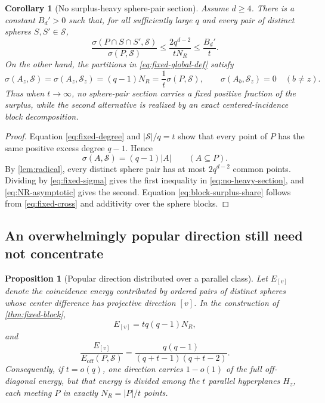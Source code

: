 \documentclass[11pt,letterpaper]{amsart}
\newtheorem{proposition}[proposition]{Proposition}
\newtheorem{corollary}[corollary]{Corollary}
\theoremstyle{definition}
\theoremstyle{remark}
\newcommand{\1}{\mathbf 1}
\begin{document}
\begin{corollary}[No surplus-heavy sphere-pair section]\label{cor:no-heavy-section}
Assume $d\ge4$.  There is a constant $B_d'>0$ such that, for all sufficiently large $q$ and every pair of distinct spheres $S,S'\in\mathcal S$,
\begin{equation}\label{eq:no-heavy-section}
 \frac{\sigma(P\cap S\cap S',\mathcal S)}
 {\sigma(P,\mathcal S)}
 \le\frac{2q^{d-2}}{tN_R}
 \le\frac{B_d'}{t}.
\end{equation}
On the other hand, the partitions in \eqref{eq:fixed-global-def} satisfy
\begin{equation}\label{eq:block-surplus-share}
 \sigma(A_z,\mathcal S)=\sigma(A_z,\mathcal S_z)=(q-1)N_R
 =\frac1t\sigma(P,\mathcal S),
 \qquad
 \sigma(A_b,\mathcal S_z)=0\quad(b\ne z).
\end{equation}
Thus when $t\to\infty$, no sphere-pair section carries a fixed positive fraction of the surplus, while the second alternative is realized by an exact centered-incidence block decomposition.
\end{corollary}

\begin{proof}
Equation \eqref{eq:fixed-degree} and $|\mathcal S|/q=t$ show that every point of $P$ has the same positive excess degree $q-1$.  Hence
\[
 \sigma(A,\mathcal S)=(q-1)|A|
 \qquad(A\subseteq P).
\]
By \cref{lem:radical}, every distinct sphere pair has at most $2q^{d-2}$ common points.  Dividing by \eqref{eq:fixed-sigma} gives the first inequality in \eqref{eq:no-heavy-section}, and \eqref{eq:NR-asymptotic} gives the second.  Equation \eqref{eq:block-surplus-share} follows from \eqref{eq:fixed-cross} and additivity over the sphere blocks.
\end{proof}

\subsection{An overwhelmingly popular direction still need not concentrate}

\begin{proposition}[Popular direction distributed over a parallel class]\label{prop:fixed-popular}
Let $E_{[v]}$ denote the coincidence energy contributed by ordered pairs of distinct spheres whose center difference has projective direction $[v]$.  In the construction of \cref{thm:fixed-block},
\begin{equation}\label{eq:fixed-direction-energy}
 E_{[v]}=tq(q-1)N_R,
\end{equation}
and
\begin{equation}\label{eq:fixed-direction-ratio}
 \frac{E_{[v]}}{E_{\mathrm{off}}(P,\mathcal S)}
 =\frac{q(q-1)}{(q+t-1)(q+t-2)}.
\end{equation}
Consequently, if $t=o(q)$, one direction carries $1-o(1)$ of the full off-diagonal energy, but that energy is divided among the $t$ parallel hyperplanes $H_z$, each meeting $P$ in exactly $N_R=|P|/t$ points.
\end{proposition}
\end{document}
